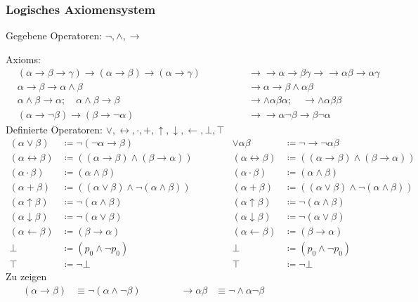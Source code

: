 \documentclass[english,ngerman,parskip=half,headsepline,footsepline,
	fleqn,notitlepage]{scrreprt}
\newcommand*{\defeq}{\coloneqq}%
\newcommand*{\ladd}{+}
\newcommand*{\lmult}{\cdot}
\newcommand*{\ltrue}{\top}%
\newcommand*{\lfalse}{\bot}%
\newcommand*{\lrep}{\leftarrow}%
\newcommand*{\limp}{\rightarrow}%
\newcommand*{\lequiv}{\leftrightarrow}%
\newcommand*{\lnand}{\uparrow}%
\newcommand*{\lnor}{\downarrow}%
\newcommand*{\formulatoleft}{&&&&&&&&&&}%
\newcommand*{\formulaspace}{&&&&}%
\newcommand*{\glsidxPl}[1]{\glspl{#1}\idx{\gls{#1}}}%
\begin{document}
	\subsubsection{Logisches Axiomensystem}%
	\label{subsub:AussagenlogischeAxiome}
	Gegebene Operatoren: $\lnot, \land, \limp$\par
	\glsidxPl{Axiom}:
	\begin{align}
		&(\alpha\limp\beta\limp\gamma)\limp(\alpha\limp\beta)%
			\limp(\alpha\limp\gamma)
		\formulaspace&&%
		\limp\limp\alpha\limp\beta\gamma\limp\limp\alpha\beta%
			\limp\alpha\gamma\\
		&\alpha\limp\beta\limp\alpha\land\beta
		\formulaspace&&%
		\limp\alpha\limp\beta\land\alpha\beta\\
		&\alpha\land\beta\limp\alpha ;\quad\alpha\land\beta\limp\beta
		\formulaspace&&%
		\limp\land\alpha\beta\alpha ;\quad\limp\land\alpha\beta\beta\\
		&(\alpha\limp\lnot\beta)\limp(\beta\limp\lnot\alpha)
		\formulaspace&&%
		\limp\limp\alpha\lnot\beta\limp\beta\lnot\alpha
		\formulatoleft
	\end{align}
	Definierte Operatoren: $\lor, \lequiv, \lmult, \ladd,
		\lnand, \lnor, \lrep, \lfalse, \ltrue$
	\begin{align}
		(\alpha\lor\beta)&\defeq\lnot(\lnot\alpha\limp\beta)
		\formulaspace&%
		\lor\alpha\beta&\defeq\lnot\limp\lnot\alpha\beta\\
		(\alpha\lequiv\beta)&\defeq
		((\alpha\limp\beta)\land(\beta\limp\alpha))
		\formulaspace&%
		(\alpha\lequiv\beta)&\defeq((\alpha\limp\beta)%
			\land(\beta\limp\alpha))\\
		(\alpha\lmult\beta)&\defeq(\alpha\land\beta)
		\formulaspace&%
		(\alpha\lmult\beta)&\defeq(\alpha\land\beta)\\
		(\alpha\ladd\beta)&\defeq((\alpha\lor\beta)%
			\land\lnot(\alpha\land\beta))
		\formulaspace&%
		(\alpha\ladd\beta)&\defeq((\alpha\lor\beta)%
			\land\lnot(\alpha\land\beta))\\
		(\alpha\lnand\beta)&\defeq\lnot(\alpha\land\beta)
		\formulaspace&%
		(\alpha\lnand\beta)&\defeq\lnot(\alpha\land\beta)\\
		(\alpha\lnor\beta)&\defeq\lnot(\alpha\lor\beta)
		\formulaspace&%
		(\alpha\lnor\beta)&\defeq\lnot(\alpha\lor\beta)\\
		(\alpha\lrep\beta)&\defeq(\beta\limp\alpha)
		\formulaspace&%
		(\alpha\lrep\beta)&\defeq(\beta\limp\alpha)\\
		\lfalse&\defeq(p_0\land\lnot p_0)
		\formulaspace&%
		\lfalse&\defeq(p_0\land\lnot p_0)\\
		\ltrue&\defeq\lnot\lfalse
		\formulaspace&%
		\ltrue&\defeq\lnot\lfalse
		\formulatoleft
	\end{align}
	Zu zeigen
	\begin{align}
		(\alpha\limp\beta)&\equiv\lnot(\alpha\land\lnot\beta)
		\formulaspace
		&\limp\alpha\beta&\equiv\lnot\land\alpha\lnot\beta
		\formulatoleft
	\end{align}
\end{document}
